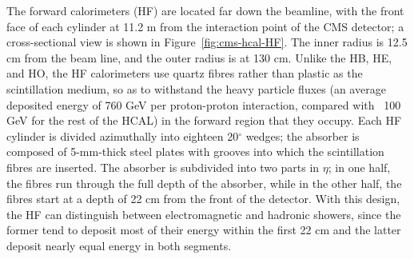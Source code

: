 The forward calorimeters (HF)  are located far down the beamline, with the front face of each cylinder at 11.2 m from the interaction point of the CMS detector; a cross-sectional view is shown in Figure~\ref{fig:cms-hcal-HF}. The inner radius is 12.5 cm from the beam line, and the outer radius is at 130 cm. Unlike the HB, HE, and HO, the HF calorimeters use quartz fibres rather than plastic as the scintillation medium, so as to withstand the heavy particle fluxes (an average deposited energy of 760 GeV per proton-proton interaction, compared with ~100 GeV for the rest of the HCAL) in the forward region that they occupy. Each HF cylinder is divided azimuthally into eighteen 20$^{\circ}$ wedges; the absorber is composed of 5-mm-thick steel plates with grooves into which the scintillation fibres are inserted. The absorber is subdivided into two parts in $\eta$; in one half, the fibres run through the full depth of the absorber, while in the other half, the fibres start at a depth of 22 cm from the front of the detector. With this design, the HF can distinguish between electromagnetic and hadronic showers, since the former tend to deposit most of their energy within the first 22 cm and the latter deposit nearly equal energy in both segments. 

